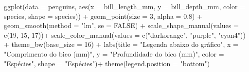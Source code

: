 \documentclass[
]{book}
\newenvironment{Shaded}{\begin{snugshade}}{\end{snugshade}}
\newcommand{\AttributeTok}[1]{\textcolor[rgb]{0.61,0.61,0.61}{#1}}
\newcommand{\ConstantTok}[1]{\textcolor[rgb]{0,0,0}{#1}}
\newcommand{\DecValTok}[1]{\textcolor[rgb]{0.06,0.06,0.06}{#1}}
\newcommand{\FloatTok}[1]{\textcolor[rgb]{0.06,0.06,0.06}{#1}}
\newcommand{\FunctionTok}[1]{\textcolor[rgb]{0,0,0}{#1}}
\newcommand{\NormalTok}[1]{#1}
\newcommand{\SpecialCharTok}[1]{\textcolor[rgb]{0,0,0}{#1}}
\newcommand{\StringTok}[1]{\textcolor[rgb]{0.5,0.5,0.5}{#1}}
\begin{document}
\begin{Shaded}
\begin{Highlighting}[]
\FunctionTok{ggplot}\NormalTok{(}\AttributeTok{data =}\NormalTok{ penguins, }
       \FunctionTok{aes}\NormalTok{(}\AttributeTok{x =}\NormalTok{ bill\_length\_mm, }
           \AttributeTok{y =}\NormalTok{ bill\_depth\_mm,}
           \AttributeTok{color =}\NormalTok{ species,}
           \AttributeTok{shape =}\NormalTok{ species)) }\SpecialCharTok{+}
  \FunctionTok{geom\_point}\NormalTok{(}\AttributeTok{size =} \DecValTok{3}\NormalTok{, }
             \AttributeTok{alpha =} \FloatTok{0.8}\NormalTok{) }\SpecialCharTok{+}
  \FunctionTok{geom\_smooth}\NormalTok{(}\AttributeTok{method =} \StringTok{"lm"}\NormalTok{, }\AttributeTok{se =} \ConstantTok{FALSE}\NormalTok{) }\SpecialCharTok{+}
  \FunctionTok{scale\_shape\_manual}\NormalTok{(}\AttributeTok{values =} \FunctionTok{c}\NormalTok{(}\DecValTok{19}\NormalTok{, }\DecValTok{15}\NormalTok{, }\DecValTok{17}\NormalTok{))}\SpecialCharTok{+}
  \FunctionTok{scale\_color\_manual}\NormalTok{(}\AttributeTok{values =} \FunctionTok{c}\NormalTok{(}\StringTok{"darkorange"}\NormalTok{, }\StringTok{"purple"}\NormalTok{, }\StringTok{"cyan4"}\NormalTok{)) }\SpecialCharTok{+}
  \FunctionTok{theme\_bw}\NormalTok{(}\AttributeTok{base\_size =} \DecValTok{16}\NormalTok{) }\SpecialCharTok{+}
  \FunctionTok{labs}\NormalTok{(}\AttributeTok{title =} \StringTok{"Legenda abaixo do gráfico"}\NormalTok{, }\AttributeTok{x =} \StringTok{"Comprimento do bico (mm)"}\NormalTok{, }\AttributeTok{y =} \StringTok{"Profundidade do bico (mm)"}\NormalTok{, }
       \AttributeTok{color =} \StringTok{"Espécies"}\NormalTok{, }\AttributeTok{shape =} \StringTok{"Espécies"}\NormalTok{)}\SpecialCharTok{+}
  \FunctionTok{theme}\NormalTok{(}\AttributeTok{legend.position =} \StringTok{"bottom"}\NormalTok{)}


\end{Highlighting}
\end{Shaded}
\end{document}
